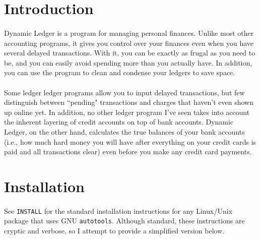 \documentclass{article}
\begin{document}
\begin{flushleft}

\section{Introduction}

\paragraph{} Dynamic Ledger is a program for managing personal finances. Unlike most other accounting programs, it gives you control over your finances even when you have several delayed transactions. With it, you can be exactly as frugal as you need to be, and you can easily avoid spending more than you actually have. In addition, you can use the program to clean and condense your ledgers to save space.

\paragraph{} Some ledger ledger programs allow you to input delayed transactions, but few distinguish between ``pending" transactions and charges that haven't even shown up online yet. In addition, no other ledger program I've seen takes into account the inherent layering of credit accounts on top of bank accounts. Dynamic Ledger, on the other hand, calculates the true balances of your bank accounts (i.e., how much hard money you will have after everything on your credit cards is paid and all transactions clear) even before you make any credit card payments.


\section{Installation}

\paragraph{} See {\tt INSTALL} for the standard installation instructions for any Linux/Unix package that uses GNU {\tt autotools}. Although standard, these instructions are cryptic and verbose, so I attempt to provide a simplified version below. 


\end{flushleft}
\end{document}
